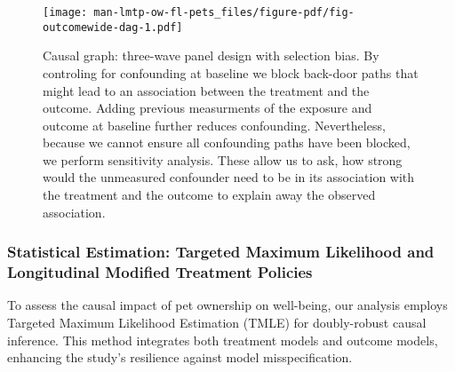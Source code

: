 \documentclass[
  singlecolumn,
  9pt]{article}
\begin{document}
\newpage{}

\begin{figure}

{\centering \texttt{[image: man-lmtp-ow-fl-pets\_files/figure-pdf/fig-outcomewide-dag-1.pdf]}

}

\caption{\label{fig-outcomewide-dag}Causal graph: three-wave panel
design with selection bias. By controling for confounding at baseline we
block back-door paths that might lead to an association between the
treatment and the outcome. Adding previous measurments of the exposure
and outcome at baseline further reduces confounding. Nevertheless,
because we cannot ensure all confounding paths have been blocked, we
perform sensitivity analysis. These allow us to ask, how strong would
the unmeasured confounder need to be in its association with the
treatment and the outcome to explain away the observed association.}

\end{figure}

\newpage{}

\subsubsection{Statistical Estimation: Targeted Maximum Likelihood and
Longitudinal Modified Treatment
Policies}\label{statistical-estimation-targeted-maximum-likelihood-and-longitudinal-modified-treatment-policies}

To assess the causal impact of pet ownership on well-being, our analysis
employs Targeted Maximum Likelihood Estimation (TMLE) for doubly-robust
causal inference. This method integrates both treatment models and
outcome models, enhancing the study's resilience against model
misspecification.
\end{document}
